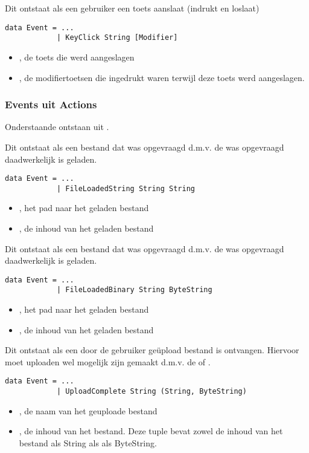Dit  ontstaat als een gebruiker een toets aanslaat (indrukt en loslaat)
\begin{lstlisting}
data Event = ...
			| KeyClick String [Modifier]
\end{lstlisting}
\begin{itemize}
	\item {}, de toets die werd aangeslagen
	\item \type{[Modifier]}, de modifiertoetsen die ingedrukt waren terwijl deze toets werd aangeslagen.
\end{itemize}

\subsubsection{Events uit Actions}
Onderstaande \events ontstaan uit \actions.

Dit  ontstaat als een bestand dat was opgevraagd d.m.v. de  was opgevraagd daadwerkelijk is geladen.
\begin{lstlisting}
data Event = ...
			| FileLoadedString String String
\end{lstlisting}
\begin{itemize}
	\item {}, het pad naar het geladen bestand
	\item {}, de inhoud van het geladen bestand
\end{itemize}

Dit  ontstaat als een bestand dat was opgevraagd d.m.v. de  was opgevraagd daadwerkelijk is geladen.
\begin{lstlisting}
data Event = ...
			| FileLoadedBinary String ByteString
\end{lstlisting}
\begin{itemize}
	\item {}, het pad naar het geladen bestand
	\item {}, de inhoud van het geladen bestand
\end{itemize}

Dit  ontstaat als een door de gebruiker geüpload bestand is ontvangen. Hiervoor moet uploaden wel mogelijk zijn gemaakt d.m.v. de  of .
\begin{lstlisting}
data Event = ...
			| UploadComplete String (String, ByteString)
\end{lstlisting}
\begin{itemize}
	\item {}, de naam van het geuploade bestand
	\item {}, de inhoud van het bestand. Deze tuple bevat zowel de inhoud van het bestand als String als als ByteString.
\end{itemize}

